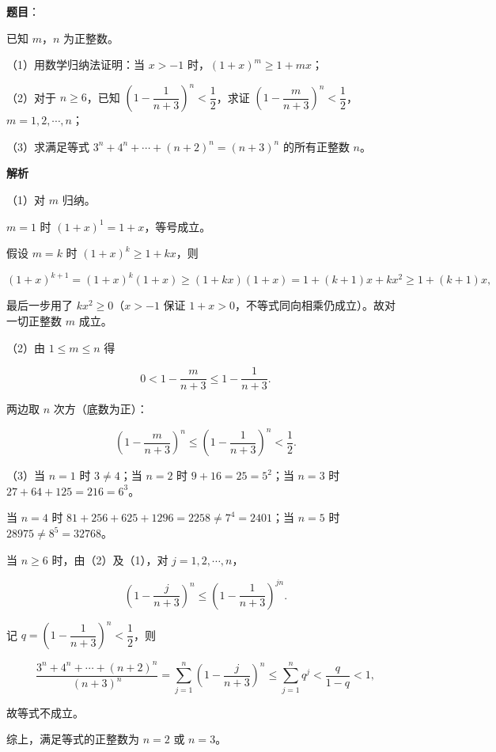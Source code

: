 \begin{answer}

\textbf{题目}：

已知 $m$，$n$ 为正整数。

（1）用数学归纳法证明：当 $x>-1$ 时，$(1+x)^m\geqslant1+mx$；

（2）对于 $n\geqslant6$，已知 $\left(1-\dfrac1{n+3}\right)^n<\dfrac12$，求证 $\left(1-\dfrac m{n+3}\right)^n<\dfrac12$，$m=1,2,\cdots,n$；

（3）求满足等式 $3^n+4^n+\cdots+(n+2)^n=(n+3)^n$ 的所有正整数 $n$。

\textbf{解析}

（1）对 $m$ 归纳。

$m=1$ 时 $(1+x)^1=1+x$，等号成立。

假设 $m=k$ 时 $(1+x)^k\geqslant1+kx$，则

\nopagebreak[4]
\[(1+x)^{k+1}=(1+x)^k(1+x)\geqslant(1+kx)(1+x)=1+(k+1)x+kx^2\geqslant1+(k+1)x,\]

最后一步用了 $kx^2\geqslant0$（$x>-1$ 保证 $1+x>0$，不等式同向相乘仍成立）。故对一切正整数 $m$ 成立。

（2）由 $1\leqslant m\leqslant n$ 得

\nopagebreak[4]
\[0<1-\frac m{n+3}\leqslant1-\frac1{n+3}.\]

两边取 $n$ 次方（底数为正）：

\nopagebreak[4]
\[\left(1-\frac m{n+3}\right)^n\leqslant\left(1-\frac1{n+3}\right)^n<\frac12.\]

（3）当 $n=1$ 时 $3\neq4$；当 $n=2$ 时 $9+16=25=5^2$；当 $n=3$ 时 $27+64+125=216=6^3$。

当 $n=4$ 时 $81+256+625+1296=2258\neq7^4=2401$；当 $n=5$ 时 $28975\neq8^5=32768$。

当 $n\geqslant6$ 时，由（2）及（1），对 $j=1,2,\cdots,n$，

\nopagebreak[4]
\[\left(1-\frac j{n+3}\right)^n\leqslant\left(1-\frac1{n+3}\right)^{jn}.\]

记 $q=\left(1-\dfrac1{n+3}\right)^n<\dfrac12$，则

\nopagebreak[4]
\[\frac{3^n+4^n+\cdots+(n+2)^n}{(n+3)^n}
=\sum_{j=1}^n\left(1-\frac j{n+3}\right)^n\leqslant\sum_{j=1}^nq^j<\frac q{1-q}<1,\]

故等式不成立。

综上，满足等式的正整数为 $n=2$ 或 $n=3$。


\end{answer}